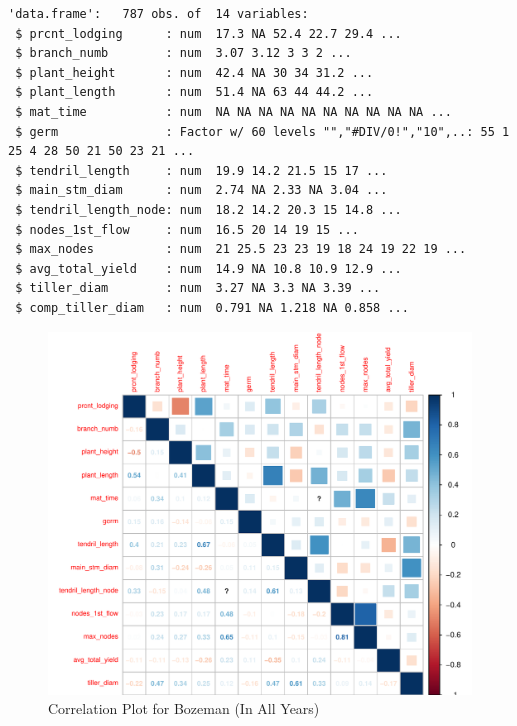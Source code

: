 \documentclass[11pt]{article}\usepackage[]{graphicx}\usepackage[]{color}
\makeatletter
\def\maxwidth{ %
  \ifdim\Gin@nat@width>\linewidth
    \linewidth
  \else
    \Gin@nat@width
  \fi
}
\newenvironment{kframe}{%
 \def\at@end@of@kframe{}%
 \ifinner\ifhmode%
  \def\at@end@of@kframe{\end{minipage}}%
  \begin{minipage}{\columnwidth}%
 \fi\fi%
 \def\FrameCommand##1{\hskip\@totalleftmargin \hskip-\fboxsep
 \colorbox{shadecolor}{##1}\hskip-\fboxsep
     \hskip-\linewidth \hskip-\@totalleftmargin \hskip\columnwidth}%
 \MakeFramed {\advance\hsize-\width
   \@totalleftmargin\z@ \linewidth\hsize
   \@setminipage}}%
 {\par\unskip\endMakeFramed%
 \at@end@of@kframe}
\newenvironment{knitrout}{}{} %
\makeatother
\begin{document}
\begin{knitrout}\footnotesize
{}\color{fgcolor}\begin{kframe}
\begin{verbatim}
'data.frame':	787 obs. of  14 variables:
 $ prcnt_lodging      : num  17.3 NA 52.4 22.7 29.4 ...
 $ branch_numb        : num  3.07 3.12 3 3 2 ...
 $ plant_height       : num  42.4 NA 30 34 31.2 ...
 $ plant_length       : num  51.4 NA 63 44 44.2 ...
 $ mat_time           : num  NA NA NA NA NA NA NA NA NA NA ...
 $ germ               : Factor w/ 60 levels "","#DIV/0!","10",..: 55 1 25 4 28 50 21 50 23 21 ...
 $ tendril_length     : num  19.9 14.2 21.5 15 17 ...
 $ main_stm_diam      : num  2.74 NA 2.33 NA 3.04 ...
 $ tendril_length_node: num  18.2 14.2 20.3 15 14.8 ...
 $ nodes_1st_flow     : num  16.5 20 14 19 15 ...
 $ max_nodes          : num  21 25.5 23 23 19 18 24 19 22 19 ...
 $ avg_total_yield    : num  14.9 NA 10.8 10.9 12.9 ...
 $ tiller_diam        : num  3.27 NA 3.3 NA 3.39 ...
 $ comp_tiller_diam   : num  0.791 NA 1.218 NA 0.858 ...
\end{verbatim}
\end{kframe}\begin{figure}[H]

{\centering \includegraphics[width=\maxwidth]{figure/merged-1} 

}

\caption[Correlation Plot for Bozeman (In All Years)]{Correlation Plot for Bozeman (In All Years)}\label{fig:merged}
\end{figure}


\end{knitrout}
\end{document}
